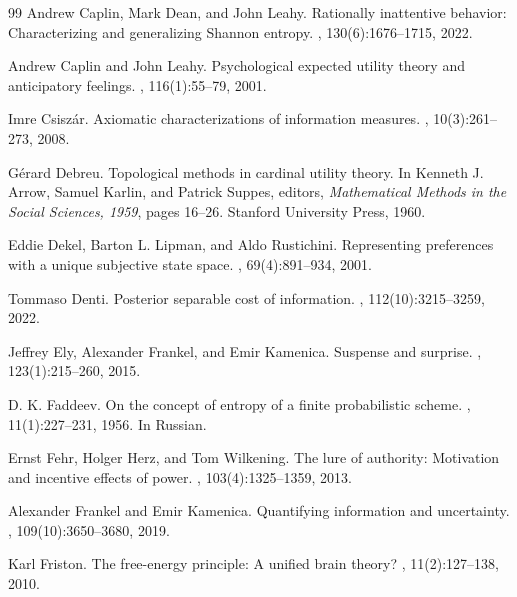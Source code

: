 \documentclass[11pt,a4paper]{article}
\theoremstyle{definition}
\newcommand{\1}{\mathbf 1}
\begin{document}
\begin{thebibliography}{99}
Andrew Caplin, Mark Dean, and John Leahy.
\newblock Rationally inattentive behavior: Characterizing and generalizing {S}hannon entropy.
, 130(6):1676--1715, 2022.

Andrew Caplin and John Leahy.
\newblock Psychological expected utility theory and anticipatory feelings.
, 116(1):55--79, 2001.

Imre Csisz\'ar.
\newblock Axiomatic characterizations of information measures.
, 10(3):261--273, 2008.

G\'erard Debreu.
\newblock Topological methods in cardinal utility theory.
\newblock In Kenneth J. Arrow, Samuel Karlin, and Patrick Suppes, editors,
  {\em Mathematical Methods in the Social Sciences, 1959}, pages 16--26.
  Stanford University Press, 1960.

Eddie Dekel, Barton L. Lipman, and Aldo Rustichini.
\newblock Representing preferences with a unique subjective state space.
, 69(4):891--934, 2001.

Tommaso Denti.
\newblock Posterior separable cost of information.
, 112(10):3215--3259, 2022.

Jeffrey Ely, Alexander Frankel, and Emir Kamenica.
\newblock Suspense and surprise.
, 123(1):215--260, 2015.

D. K. Faddeev.
\newblock On the concept of entropy of a finite probabilistic scheme.
, 11(1):227--231, 1956.
\newblock In Russian.

Ernst Fehr, Holger Herz, and Tom Wilkening.
\newblock The lure of authority: Motivation and incentive effects of power.
, 103(4):1325--1359, 2013.

Alexander Frankel and Emir Kamenica.
\newblock Quantifying information and uncertainty.
, 109(10):3650--3680, 2019.

Karl Friston.
\newblock The free-energy principle: A unified brain theory?
, 11(2):127--138, 2010.


\end{thebibliography}
\end{document}
